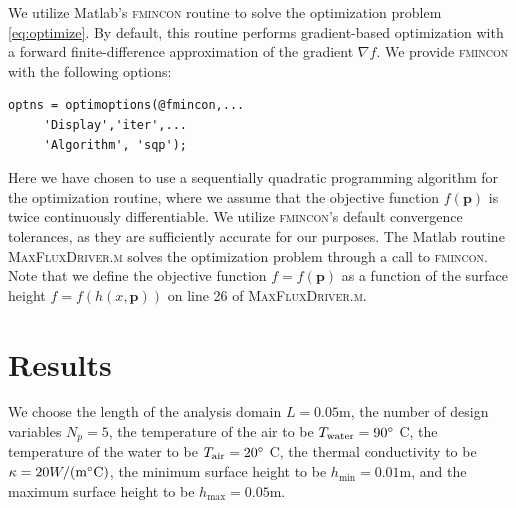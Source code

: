 \documentclass[11pt]{article}
\begin{document}
We utilize Matlab's \textsc{fmincon} routine to solve the
optimization problem \eqref{eq:optimize}. By default, this routine performs
gradient-based optimization with a forward finite-difference approximation
of the gradient $\nabla f$. We provide \textsc{fmincon} with the
following options:
\begin{verbatim}
optns = optimoptions(@fmincon,...
     'Display','iter',...
     'Algorithm', 'sqp');
\end{verbatim}
Here we have chosen to use a sequentially quadratic programming
algorithm for the optimization routine, where we assume that the
objective function $f(\boldsymbol{p})$ is twice continuously
differentiable. We utilize \textsc{fmincon}'s default convergence
tolerances, as they are sufficiently accurate for our purposes.
The Matlab routine \textsc{MaxFluxDriver.m} solves
the optimization problem through a call to \textsc{fmincon}. Note
that we define the objective function $f = f(\boldsymbol{p})$ as
a function of the surface height $f = f(h(x, \boldsymbol{p}))$ on
line 26 of \textsc{MaxFluxDriver.m}.

\section{Results}

We choose the length of the analysis domain $L=0.05$m, the
number of design variables $N_p = 5$, the temperature of the
air to be $T_\text{water} = 90 \degree$ C, the temperature of the
water to be $T_\text{air} = 20 \degree$ C, the thermal
conductivity to be $\kappa = 20 W / (\text{m} \degree \text{C})$,
the minimum surface height to be $h_{\text{min}} = 0.01$m, and
the maximum surface height to be $h_{\text{max}} = 0.05$m.
\end{document}
